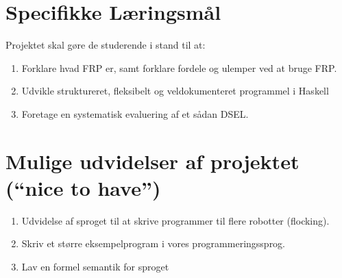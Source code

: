 \documentclass[a4paper,oneside, draft]{memoir}
\begin{document}
\section{Specifikke Læringsmål}

Projektet skal gøre de studerende i stand til at:

\begin{enumerate}

\item Forklare hvad FRP er, samt forklare fordele og ulemper ved at bruge FRP.

\item Udvikle struktureret, fleksibelt og veldokumenteret programmel i Haskell


\item Foretage en systematisk evaluering af et sådan DSEL.

\end{enumerate}


\section{Mulige udvidelser af projektet ("`nice to have"')}
\begin{enumerate}

\item Udvidelse af sproget til at skrive programmer til flere robotter (flocking).

\item Skriv et større eksempelprogram i vores programmeringssprog.

\item Lav en formel semantik for sproget

\end{enumerate}
\end{document}
